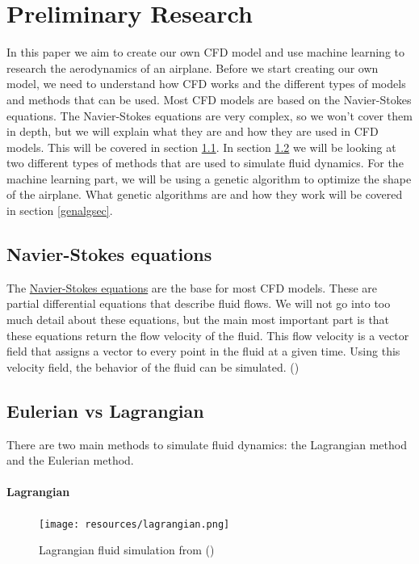 \documentclass[a4paper,12pt,titlepage]{article}
\begin{document}
\pagebreak

\section{Preliminary Research}
In this paper we aim to create our own CFD model and use machine learning to
research the aerodynamics of an airplane. Before we start creating our own model,
we need to understand how CFD works and the different types of models and methods
that can be used. Most CFD models are based on the Navier-Stokes equations.
The Navier-Stokes equations are very complex, so we won't cover them in depth,
but we will explain what they are and how they are used in CFD models.
This will be covered in section \ref{navierstokes}. In section \ref{eulerianlagrangian}
we will be looking at two different types of methods that are used to simulate
fluid dynamics. For the machine learning part, we will be using a genetic
algorithm to optimize the shape of the airplane. What genetic algorithms are and
how they work will be covered in section \ref{genalgsec}.

\subsection{Navier-Stokes equations} \label{navierstokes}
The \href{https://en.wikipedia.org/wiki/Navier%E2%80%93Stokes_equations}{Navier-Stokes equations} are the base for most CFD models.
These are partial differential equations that describe fluid flows. 
We will not go into too much detail about these equations, but the main most important part is that these equations return the flow velocity of the fluid.
This flow velocity is a vector field that assigns a vector to every point in the fluid at a given time. 
Using this velocity field, the behavior of the fluid can be simulated.
(\cite{navierstokes})

\subsection{Eulerian vs Lagrangian} \label{eulerianlagrangian}
There are two main methods to simulate fluid dynamics: the Lagrangian method and the Eulerian method.

\paragraph{Lagrangian}\mbox{}

\begin{figure}[H]
	\centering
	\texttt{[image: resources/lagrangian.png]}
	\caption{Lagrangian fluid simulation from (\cite{seblague})}
\end{figure}
\end{document}
